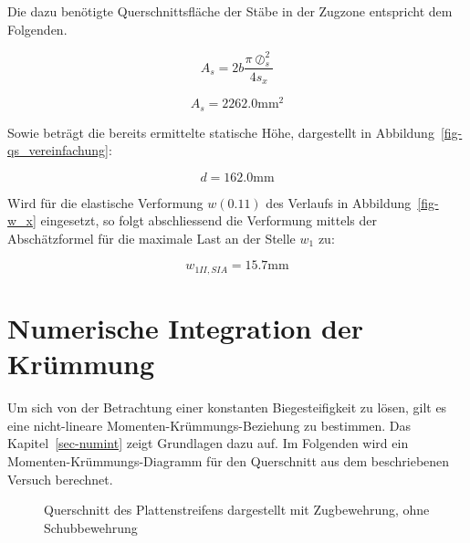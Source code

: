 \documentclass[
  12pt,
  letterpaper,
  egregdoesnotlikesansseriftitles]{scrreprt}
\begin{document}
Die dazu benötigte Querschnittsfläche der Stäbe in der Zugzone
entspricht dem Folgenden.

\begin{equation}A_{s} = 2 b \frac{\pi \oslash_{s}^{2}}{4 s_{x}}\end{equation}

\begin{equation}A_{s} = 2262.0 \text{mm}^{2}\end{equation}

Sowie beträgt die bereits ermittelte statische Höhe, dargestellt in
Abbildung~\ref{fig-qs_vereinfachung}:

\begin{equation}d = 162.0 \text{mm}\end{equation}

Wird für die elastische Verformung \(w(0.11)\) des Verlaufs in
Abbildung~\ref{fig-w_x} eingesetzt, so folgt abschliessend die
Verformung mittels der Abschätzformel für die maximale Last an der
Stelle \(w_1\) zu:

\begin{equation}w_{1 II,SIA} = 15.7 \text{mm}\end{equation}

\section{Numerische Integration der
Krümmung}\label{numerische-integration-der-kruxfcmmung}

Um sich von der Betrachtung einer konstanten Biegesteifigkeit zu lösen,
gilt es eine nicht-lineare Momenten-Krümmungs-Beziehung zu bestimmen.
Das Kapitel~\ref{sec-numint} zeigt Grundlagen dazu auf. Im Folgenden
wird ein Momenten-Krümmungs-Diagramm für den Querschnitt aus dem
beschriebenen Versuch berechnet.

\begin{figure}[H]


\caption{\label{fig-qs_a3}Querschnitt des Plattenstreifens dargestellt
mit Zugbewehrung, ohne Schubbewehrung}

\end{figure}%
\end{document}
